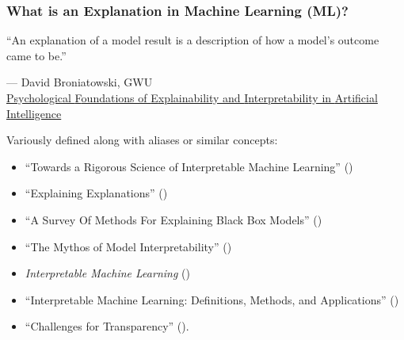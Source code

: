 \documentclass[11pt,aspectratio=169,hyperref={colorlinks}]{beamer}
\begin{document}
	\begin{frame}[t]
		
		\frametitle{What is an Explanation in Machine Learning (ML)?}
		
		\epigraph{“An explanation of a model result is a description of how a model’s outcome came to be.”}{--- \textup{David Broniatowski}, GWU\\\href{https://tsapps.nist.gov/publication/get_pdf.cfm?pub_id=931426}{Psychological {F}oundations of {E}xplainability and {I}nterpretability in {A}rtificial {I}ntelligence} \cite{broniatowski2021psychological}}		
		
		\scriptsize Variously defined along with aliases or similar concepts:
		\begin{itemize}\scriptsize
			\item ``Towards a Rigorous Science of Interpretable Machine Learning'' (\citet{been_kim1})
			\item ``Explaining Explanations'' (\citet{gilpin2018explaining})
			\item ``A Survey Of Methods For Explaining Black Box Models'' (\citet{guidotti2018survey})
			\item ``The Mythos of Model Interpretability'' (\citet{lipton1})
		 	\item \textit{Interpretable Machine Learning} (\citet{molnar})
			\item ``Interpretable Machine Learning: Definitions, Methods, and Applications'' (\citet{murdoch2019interpretable})
			\item ``Challenges for Transparency'' (\citet{weller2017challenges}). 
		\end{itemize}\normalsize
		
	\end{frame}
	
\end{document}
